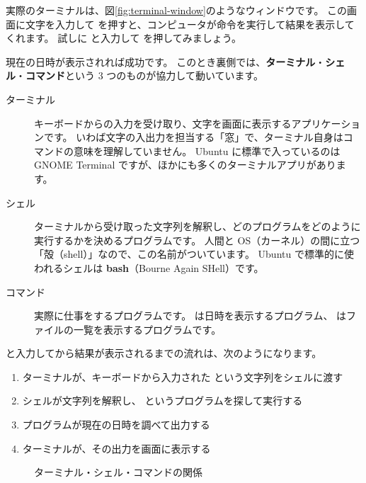 実際のターミナルは、図\ref{fig:terminal-window}のようなウィンドウです。
この画面に文字を入力して  を押すと、コンピュータが命令を実行して結果を表示してくれます。
試しに  と入力して  を押してみましょう。


現在の日時が表示されれば成功です。
このとき裏側では、\textbf{ターミナル}・\textbf{シェル}・\textbf{コマンド}という 3 つのものが協力して動いています。

\begin{description}
  \item[ターミナル]
    キーボードからの入力を受け取り、文字を画面に表示するアプリケーションです。
    いわば文字の入出力を担当する「窓」で、ターミナル自身はコマンドの意味を理解していません。
    Ubuntu に標準で入っているのは GNOME Terminal ですが、ほかにも多くのターミナルアプリがあります。
  \item[シェル]
    ターミナルから受け取った文字列を解釈し、どのプログラムをどのように実行するかを決めるプログラムです。
    人間と OS（カーネル）の間に立つ「殻（shell）」なので、この名前がついています。
    Ubuntu で標準的に使われるシェルは \textbf{bash}（Bourne Again SHell）です。
  \item[コマンド]
    実際に仕事をするプログラムです。
     は日時を表示するプログラム、 はファイルの一覧を表示するプログラムです。
\end{description}

 と入力してから結果が表示されるまでの流れは、次のようになります。

\begin{enumerate}
  \item ターミナルが、キーボードから入力された  という文字列をシェルに渡す
  \item シェルが文字列を解釈し、 というプログラムを探して実行する
  \item {} プログラムが現在の日時を調べて出力する
  \item ターミナルが、その出力を画面に表示する
\end{enumerate}

\begin{figure}[tb]
  \centering
  \large
  \caption{ターミナル・シェル・コマンドの関係}
  \label{fig:terminal-shell-command}
\end{figure}

